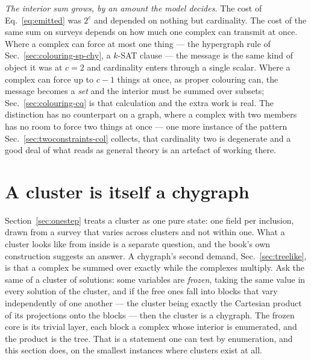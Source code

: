 \emph{The interior sum grows, by an amount the model decides.} The cost of
Eq.~\eqref{eq:emitted} was $2^{c}$ and depended on nothing but cardinality. The
cost of the same sum on surveys depends on how much one complex can transmit at
once. Where a complex can force at most one thing --- the hypergraph rule of
Sec.~\ref{sec:colouring-sp-chy}, a $k$-SAT clause --- the message is the same
kind of object it was at $c=2$ and cardinality enters through a single scalar.
Where a complex can force up to $c-1$ things at once, as proper colouring can,
the message becomes a \emph{set} and the interior must be summed over subsets;
Sec.~\ref{sec:colouring-cq} is that calculation and the extra work is real.
The distinction has no counterpart on a graph, where a complex with two members
has no room to force two things at once --- one more instance of the pattern
Sec.~\ref{sec:twoconstraints-col} collects, that cardinality two is degenerate
and a good deal of what reads as general theory is an artefact of working
there.

\section{A cluster is itself a chygraph}
\label{sec:clusterchy}

Section~\ref{sec:onestep} treats a cluster as one pure state: one field per
inclusion, drawn from a survey that varies across clusters and not within
one. What a cluster looks like from inside is a separate question, and the
book's own construction suggests an answer. A chygraph's second demand,
Sec.~\ref{sec:treelike}, is that a complex be summed over exactly while the
complexes multiply. Ask the same of a cluster of solutions: some variables
are \emph{frozen}, taking the same value in every solution of the cluster,
and if the free ones fall into blocks that vary independently of one another
--- the cluster being exactly the Cartesian product of its projections onto
the blocks --- then the cluster is a chygraph. The frozen core is its trivial
layer, each block a complex whose interior is enumerated, and the product is
the tree. That is a statement one can test by enumeration, and this section
does, on the smallest instances where clusters exist at all.

